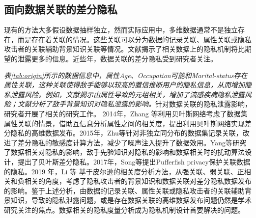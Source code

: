 

\subsection{面向数据关联的差分隐私}

现有的方法大多假设数据抽样独立，然而实际应用中，多维数据通常不是独立存在，而是存在着关联的情况。这些关联可以分为数据的记录关联、属性关联或隐私攻击者的关联辅助背景知识关联等情况。文献\cite{kifer2011no}揭示了相关数据上的隐私机制将比期望的泄露更多的信息。近些年，数据关联的差分隐私受到研究者关注。

{\em 表\ref{tab:origin}所示的数据信息中，属性Age、Occupation可能和Marital-status存在属性关联，这种关联使得敌手能够以较高的置信推断用户的隐私信息，从而增加隐私泄露风险。例如，文献\cite{zhu2015correlated}揭示由属性导致的元组相关，增加了流感疾病隐私泄露风险；文献\cite{li2019impact}分析了敌手背景知识对隐私泄露的影响。}针对数据关联的隐私泄露影响，研究者开展了相关的研究工作。
2014年，Zhang 等\cite{zhang2014privbayes}利用贝叶斯网络考虑了数据集属性关联的情景，借助互信息分析属性之间的相关度\cite{reshef2011detecting,liangjy2016}，提出利用贝叶斯网络实现差分隐私的高维数据发布。2015年，Zhu等\cite{zhu2015correlated}针对非独立同分布的数据集记录关联，改进了差分隐私的敏感度计算方法，减少了噪声注入提升了数据效用。Yang等\cite{yang2015bayesian}研究了数据相关对隐私的影响，敌手先验知识对隐私的影响和数据相关时的扰动算法设计，提出了贝叶斯差分隐私。2017年，Song等\cite{song2017pufferfish}提出Pufferfish privacy保护关联数据的隐私。2019 年，Li 等\cite{li2019impact} 基于皮尔逊的相关度分析方法，从强关联、弱关联、正相关和负相关的角度，考虑了隐私攻击者的背景知识和数据关联对差分隐私数据发布的影响。鉴于上述分析，由数据的记录关联、属性关联或隐私攻击者的关联辅助背景知识，导致的隐私泄露问题，或是存在数据关联的高维数据发布问题仍然是学术研究关注的焦点。数据相关的隐私度量分析成为隐私机制设计首要解决的问题。


